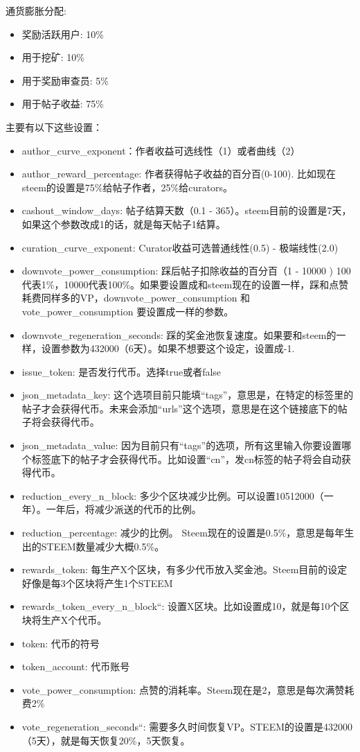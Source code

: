\documentclass[]{ctexbook}
\providecommand{\tightlist}{%
  \setlength{\itemsep}{0pt}\setlength{\parskip}{0pt}}
\begin{document}
通货膨胀分配:

\begin{itemize}
\tightlist
\item
  奖励活跃用户: 10\%
\item
  用于挖矿: 10\%
\item
  用于奖励审查员: 5\%
\item
  用于帖子收益: 75\%
\end{itemize}

主要有以下这些设置：

\begin{itemize}
\tightlist
\item
  author\_curve\_exponent：作者收益可选线性（1）或者曲线（2）
\item
  author\_reward\_percentage: 作者获得帖子收益的百分百(0-100). 比如现在steem的设置是75\%给帖子作者，25\%给curators。
\item
  cashout\_window\_days: 帖子结算天数（0.1 - 365）。steem目前的设置是7天，如果这个参数改成1的话，就是每天帖子1结算。
\item
  curation\_curve\_exponent: Curator收益可选普通线性(0.5) - 极端线性(2.0)
\item
  downvote\_power\_consumption: 踩后帖子扣除收益的百分百（1 - 10000 ) 100代表1\%，10000代表100\%。如果要设置成和steem现在的设置一样，踩和点赞耗费同样多的VP，downvote\_power\_consumption 和 vote\_power\_consumption 要设置成一样的参数。
\item
  downvote\_regeneration\_seconds: 踩的奖金池恢复速度。如果要和steem的一样，设置参数为432000（6天）。如果不想要这个设定，设置成-1.
\item
  issue\_token: 是否发行代币。选择true或者false
\item
  json\_metadata\_key: 这个选项目前只能填``tags''，意思是，在特定的标签里的帖子才会获得代币。未来会添加``urls''这个选项，意思是在这个链接底下的帖子将会获得代币。
\item
  json\_metadata\_value: 因为目前只有``tags''的选项，所有这里输入你要设置哪个标签底下的帖子才会获得代币。比如设置``cn''，发cn标签的帖子将会自动获得代币。
\item
  reduction\_every\_n\_block: 多少个区块减少比例。可以设置10512000（一年）。一年后，将减少派送的代币的比例。
\item
  reduction\_percentage: 减少的比例。 Steem现在的设置是0.5\%，意思是每年生出的STEEM数量减少大概0.5\%。
\item
  rewards\_token: 每生产X个区块，有多少代币放入奖金池。Steem目前的设定好像是每3个区块将产生1个STEEM
\item
  rewards\_token\_every\_n\_block``: 设置X区块。比如设置成10，就是每10个区块将生产X个代币。
\item
  token: 代币的符号
\item
  token\_account: 代币账号
\item
  vote\_power\_consumption: 点赞的消耗率。Steem现在是2，意思是每次满赞耗费2\%
\item
  vote\_regeneration\_seconds``: 需要多久时间恢复VP。STEEM的设置是432000（5天），就是每天恢复20\%，5天恢复。
\end{itemize}
\end{document}
